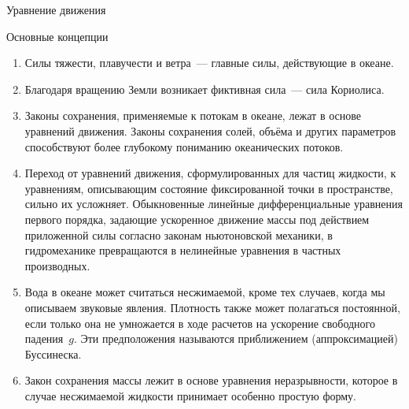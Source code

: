 \begin{chapter}{Уравнение движения}
\begin{section}{Основные концепции}
\begin{enumerate}
\item
Силы тяжести, плавучести и ветра~--- главные силы, действующие в океане.
%

\item
Благодаря вращению Земли возникает фиктивная сила~--- сила Кориолиса.
%

\item
Законы сохранения, применяемые к потокам в океане, лежат в основе уравнений
движения. Законы сохранения солей, объёма и других параметров способствуют
более глубокому пониманию океанических потоков.
%

\item
Переход от уравнений движения, сформулированных для частиц жидкости, 
к уравнениям, описывающим состояние фиксированной точки в пространстве, сильно
их усложняет. Обыкновенные линейные дифференциальные уравнения первого порядка, 
задающие ускоренное движение массы под действием приложенной силы согласно 
законам ньютоновской механики, в гидромеханике превращаются в нелинейные 
уравнения в частных производных.
%

\item
Вода в океане может считаться несжимаемой, кроме тех случаев, когда мы
описываем звуковые явления. Плотность также может полагаться постоянной, 
если только она не умножается в ходе расчетов на ускорение свободного 
падения~$g$. Эти предположения называются приближением (аппроксимацией) 
Буссинеска.
%

\item
Закон сохранения массы лежит в основе уравнения неразрывности, которое 
в случае несжимаемой жидкости принимает особенно простую форму.
%
\end{enumerate}
\end{section}
\end{chapter}
